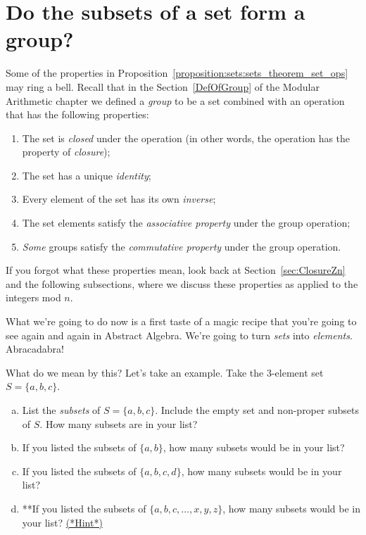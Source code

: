 \section{Do the subsets of a set form a group?}\label{SetGroup} 
Some of the properties in Proposition~\ref{proposition:sets:sets_theorem_set_ops} may ring a bell. Recall that in the Section~\ref{DefOfGroup} of the Modular Arithmetic chapter  we defined a \emph{group} to be a set combined with an operation that has the following properties:
\begin{enumerate}
\item
The set is \emph{closed} under the operation (in other words, the operation has the property of \emph{closure});
\item
The set has  a unique \emph{identity};
\item
Every element of the set has its own \emph{inverse};
\item
The set elements satisfy the \emph{associative property} under the group operation;
\item
\emph{Some} groups satisfy the \emph{commutative property} under the group operation.
\end{enumerate}

\noindent
If you forgot what these properties mean, look back at Section~\ref{sec:ClosureZn} and the following subsections, where we discuss these properties as applied to the integers mod $n$.

What we're going to do now is a first taste of a magic recipe that you're going to see again and again in Abstract Algebra. We're going to turn \emph{sets} into \emph{elements}. Abracadabra!

What do we mean by this? Let's take an example. Take the 3-element set $S = \{a,b,c\}$. 

\begin{exercise}{31}
\begin{enumerate}[(a)]
\item
List the \emph{subsets} of $S =  \{a,b,c\}$. Include the empty set and non-proper subsets of $S$. How many subsets are in your list?
\item
If you listed the subsets of $\{a,b\}$, how many subsets would be in your list?
\item
If you listed the subsets of $\{a,b,c,d\}$, how many subsets would be in your list?
\item
**If you listed the subsets of $\{a,b,c,\ldots,x,y,z\}$, how many subsets would be in your list?
\hyperref[sec:set_chapter:hints]{(*Hint*)}
\end{enumerate}
\end{exercise}

